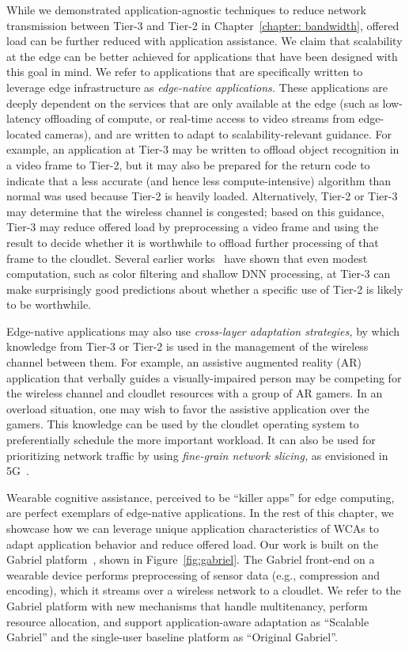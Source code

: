 While we demonstrated application-agnostic techniques to reduce network
transmission between Tier-3 and Tier-2 in Chapter~\ref{chapter: bandwidth},
offered load can be further reduced with application assistance. We claim that
scalability at the edge can be better achieved for applications that have been
designed with this goal in mind.  We refer to applications that are specifically
written to leverage edge infrastructure as {\em edge-native applications.} These
applications are deeply dependent on the services that are only available at the
edge (such as low-latency offloading of compute, or real-time access to video
streams from edge-located cameras), and are written to adapt to
scalability-relevant guidance.  For example, an application at Tier-3 may be
written to offload object recognition in a video frame to Tier-2, but it may
also be prepared for the return code to indicate that a less accurate (and hence
less compute-intensive) algorithm than normal was used because Tier-2 is heavily
loaded.  Alternatively, Tier-2 or Tier-3 may determine that the wireless channel
is congested; based on this guidance, Tier-3 may reduce offered load by
preprocessing a video frame and using the result to decide whether it is
worthwhile to offload further processing of that frame to the cloudlet.  Several
earlier works~\cite{Hu2015, christensen2019towards} have shown that even
modest computation, such as color filtering and shallow DNN processing, at Tier-3
can make surprisingly good predictions about whether a specific use of Tier-2 is
likely to be worthwhile.

Edge-native applications may also use {\em cross-layer adaptation
  strategies,} by which knowledge from Tier-3 or Tier-2 is used in the
management of the wireless channel between them.  For example, an
assistive augmented reality (AR) application that verbally guides a
visually-impaired person may be competing for the wireless channel and
cloudlet resources with a group of AR gamers.  In an overload
situation, one may wish to favor the assistive application over the
gamers.  This knowledge can be used by the cloudlet operating system
to preferentially schedule the more important workload.  It can also
be used for prioritizing network traffic by using {\em fine-grain
  network slicing,} as envisioned in 5G~\cite{Contreras2018}.

Wearable cognitive assistance, perceived to be ``killer apps'' for edge
computing, are perfect exemplars of edge-native applications. In the rest of
this chapter, we showcase how we can leverage unique application characteristics
of WCAs to adapt application behavior and reduce offered load. Our work is built
on the Gabriel platform~\cite{ha2014towards,chen2017empirical}, shown in
Figure~\ref{fig:gabriel}. The Gabriel front-end on a wearable device performs
preprocessing of sensor data (e.g., compression and encoding), which it streams
over a wireless network to a cloudlet. We refer to the Gabriel platform with new
mechanisms that handle multitenancy, perform resource allocation, and support
application-aware adaptation as ``Scalable Gabriel'' and the single-user
baseline platform as ``Original Gabriel''.

